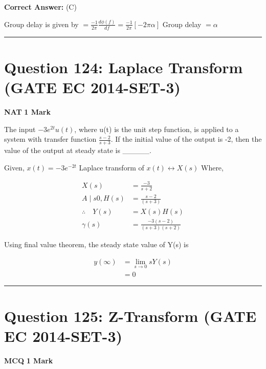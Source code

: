 \documentclass[11pt,a4paper]{article}
\begin{document}
\noindent \textbf{Correct Answer:} (C)

\begin{tcolorbox}[solbox, title=Detailed Solution -- Question 123]
Group delay is given by
$=\frac{-1}{2 \pi} \frac{d \phi(f)}{d f}=\frac{-1}{2 \pi}[-2 \pi \alpha]$
 Group delay $=\alpha$
\end{tcolorbox}

\vspace{1.5em}
\hrule
\vspace{1.5em}

\section*{Question 124: Laplace Transform (GATE EC 2014-SET-3)}
\noindent \textbf{\color{primary}NAT} \hfill \textbf{\color{secondary}1 Mark}


\noindent The input $-3e^{2t}u(t)$, where u(t) is the unit step function, is applied to a
system with transfer function $\frac{s-2}{s+3}$. If the initial value of the output is -2, then the value of the output at steady state is \_\_\_\_\_.


\begin{tcolorbox}[solbox, title=Detailed Solution -- Question 124]
Given, $x(t)=-3 e^{-2 t}$
 Laplace transform of
$x(t) \longleftrightarrow X(s)$
 Where,

\[
\begin{aligned} X(s) &=\frac{-3}{s+2} \\ A \mid s 0, H(s) &=\frac{s-2}{(s+3)} \\ \therefore \quad Y(s) &=X(s) H(s) \\ \gamma(s) &=\frac{-3(s-2)}{(s+3)(s+2)} \end{aligned}
\]

Using final value theorem, the steady state value 
 of Y(s) is

\[
\begin{aligned} y(\infty) &=\lim _{s \rightarrow 0} s Y(s) \\ &=0 \end{aligned}
\]
\end{tcolorbox}

\vspace{1.5em}
\hrule
\vspace{1.5em}

\section*{Question 125: Z-Transform (GATE EC 2014-SET-3)}
\noindent \textbf{\color{primary}MCQ} \hfill \textbf{\color{secondary}1 Mark}
\end{document}
